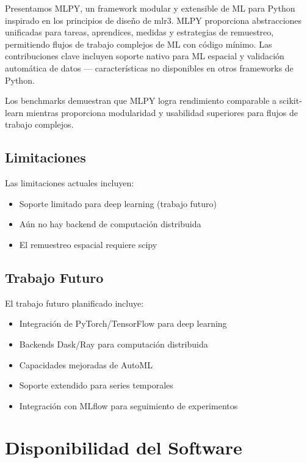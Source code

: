 \documentclass[twoside,11pt]{article}
\begin{document}
Presentamos MLPY, un framework modular y extensible de ML para Python inspirado en los principios de diseño de mlr3. MLPY proporciona abstracciones unificadas para tareas, aprendices, medidas y estrategias de remuestreo, permitiendo flujos de trabajo complejos de ML con código mínimo. Las contribuciones clave incluyen soporte nativo para ML espacial y validación automática de datos --- características no disponibles en otros frameworks de Python.

Los benchmarks demuestran que MLPY logra rendimiento comparable a scikit-learn mientras proporciona modularidad y usabilidad superiores para flujos de trabajo complejos.

\subsection{Limitaciones}

Las limitaciones actuales incluyen:
\begin{itemize}
  \item Soporte limitado para deep learning (trabajo futuro)
  \item Aún no hay backend de computación distribuida
  \item El remuestreo espacial requiere scipy
\end{itemize}

\subsection{Trabajo Futuro}

El trabajo futuro planificado incluye:
\begin{itemize}
  \item Integración de PyTorch/TensorFlow para deep learning
  \item Backends Dask/Ray para computación distribuida
  \item Capacidades mejoradas de AutoML
  \item Soporte extendido para series temporales
  \item Integración con MLflow para seguimiento de experimentos
\end{itemize}

\section{Disponibilidad del Software}
\label{sec:software}
\end{document}
